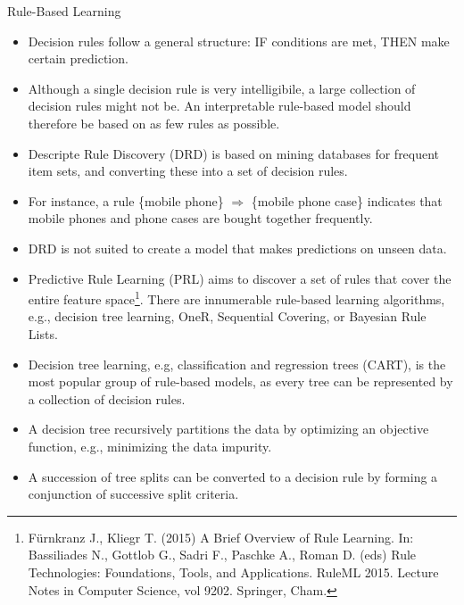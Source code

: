 \documentclass[11pt,compress,t,notes=noshow, aspectratio=169, xcolor=table]{beamer}
\begin{document}
\begin{frame}{Rule-Based Learning}

\begin{itemize}
\item
Decision rules follow a general structure: IF conditions are met, THEN make certain prediction.
\item Although a single decision rule is very intelligibile, a large collection of decision rules might not be. An interpretable rule-based model should therefore be based on as few rules as possible.
\item Descripte Rule Discovery (DRD) is based on mining databases for frequent item sets, and converting these into a set of decision rules.
\item For instance, a rule \{mobile phone\} $\Rightarrow$ \{mobile phone case\} indicates that mobile phones and phone cases are bought together frequently.
\item
DRD is not suited to create a model that makes predictions on unseen data.
\item Predictive Rule Learning (PRL) aims to discover a set of rules that cover the entire feature space\footnote[frame]{Fürnkranz J., Kliegr T. (2015) A Brief Overview of Rule Learning. In: Bassiliades N., Gottlob G., Sadri F., Paschke A., Roman D. (eds) Rule Technologies: Foundations, Tools, and Applications. RuleML 2015. Lecture Notes in Computer Science, vol 9202. Springer, Cham.}. There are innumerable rule-based learning algorithms, e.g., decision tree learning, OneR, Sequential Covering, or Bayesian Rule Lists.
\item Decision tree learning, e.g, classification and regression trees (CART), is the most popular group of rule-based models, as every tree can be represented by a collection of decision rules.
\item A decision tree recursively partitions the data by optimizing an objective function, e.g., minimizing the data impurity.
\item A succession of tree splits can be converted to a decision rule by forming a conjunction of successive split criteria.
\end{itemize}
\end{frame}
\end{document}

